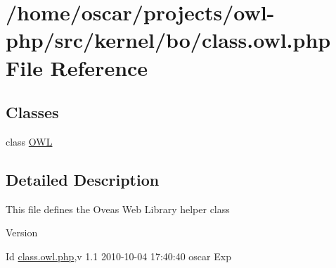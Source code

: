 \section{/home/oscar/projects/owl-\/php/src/kernel/bo/class.owl.php File Reference}
\label{class_8owl_8php}
\subsection*{Classes}
\begin{DoxyCompactItemize}
\item 
class \hyperlink{classOWL}{OWL}
\end{DoxyCompactItemize}


\subsection{Detailed Description}
This file defines the Oveas Web Library helper class \begin{DoxyVersion}{Version}

\end{DoxyVersion}
\begin{DoxyParagraph}{Id}
\hyperlink{class_8owl_8php}{class.owl.php},v 1.1 2010-\/10-\/04 17:40:40 oscar Exp 
\end{DoxyParagraph}
